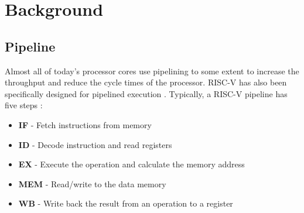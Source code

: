 \chapter{Background}
\label{ch:Background} 

%
%
%

%
%


\section{Pipeline}
\label{sec:bg_pipeline}

Almost all of today's processor cores use pipelining to some extent to increase the throughput and reduce the cycle times of the processor. RISC-V has also been specifically designed for pipelined execution \cite{pattersonComputerOrganizationDesign2021}. 
Typically, a RISC-V pipeline has five steps \cite{pattersonComputerOrganizationDesign2021}:

\begin{itemize}
    \item \textbf{IF} - Fetch instructions from memory
    \item \textbf{ID} - Decode instruction and read registers
    \item \textbf{EX} - Execute the operation and calculate the memory address
    \item \textbf{MEM} - Read/write to the data memory
    \item \textbf{WB} - Write back the result from an operation to a register
\end{itemize}

